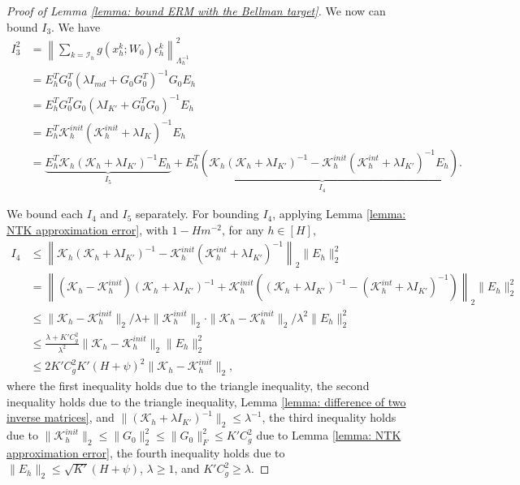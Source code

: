 \documentclass{article} \usepackage{iclr2023/iclr2023_conference,times}
\begin{document}
\begin{proof}[Proof of Lemma \ref{lemma: bound ERM with the Bellman target}]
We now can bound $I_3$. We have 
\begin{align}
    I_3^2 &= \left\| \sum_{k=\mathcal{I}_h} g(x^k_h; W_0) \epsilon^k_h \right\|_{\Lambda_h^{-1}}^2 \nonumber \\ 
    &= E_h^T G_0^T (\lambda I_{md} + G_0 G_0^T)^{-1} G_0 E_h \nonumber \\ 
    &= E_h^T G_0^T G_0 (\lambda I_{K'} + G_0^T G_0)^{-1} E_h \nonumber \\  
    &= E_h^T  \mathcal{K}^{init}_h ( \mathcal{K}^{init}_h + \lambda I_K)^{-1} E_h \nonumber \nonumber \\  
    &= \underbrace{E_h^T  \mathcal{K}_h ( \mathcal{K}_h + \lambda I_{K'})^{-1} E_h}_{I_5} +  \underbrace{ E_h^T \left( \mathcal{K}_h ( \mathcal{K}_h + \lambda I_{K'})^{-1} - \mathcal{K}^{init}_h ( \mathcal{K}^{int}_h + \lambda I_{K'})^{-1}  E_h \right)}_{I_4}.
    \label{eq: I3 in terms of I4 and I5}
\end{align}


We bound each $I_4$ and $I_5$ separately. For bounding $I_4$, applying Lemma \ref{lemma: NTK approximation error}, with $1 - H m^{-2}$, for any $h \in [H]$, 
\begin{align}
     I_4  &\leq \left\| \mathcal{K}_h ( \mathcal{K}_h + \lambda I_{K'})^{-1} - \mathcal{K}^{init}_h ( \mathcal{K}^{int}_h + \lambda I_{K'})^{-1} \right\|_2 \| E_h \|_2^2 \nonumber\\ 
    &= \left\| (\mathcal{K}_h - \mathcal{K}_h^{init}) ( \mathcal{K}_h + \lambda I_{K'})^{-1} + \mathcal{K}_h^{init} \left( ( \mathcal{K}_h + \lambda I_{K'})^{-1} -  (\mathcal{K}^{int}_h + \lambda I_{K'})^{-1}\right) \right\|_2 \| E_h \|_2^2 \nonumber\\
    &\leq  \| \mathcal{K}_h -  \mathcal{K}_h^{init} \|_2 / \lambda + \| \mathcal{K}_h^{init} \|_2 \cdot \| \mathcal{K}_h - \mathcal{K}_h^{init} \|_2 / \lambda^{2} \| E_h \|_2^2 \nonumber\\
    &\leq \frac{\lambda + K' C_g^2}{\lambda^2} \| \mathcal{K}_h - \mathcal{K}_h^{init} \|_2 \| E_h \|_2^2 \nonumber\\ 
&\leq 2 K' C_g^2  K' (H + \psi)^2  \| \mathcal{K}_h - \mathcal{K}_h^{init} \|_2,
    \label{eq: bound approx error of self-normalized process}
\end{align}
where the first inequality holds due to the triangle inequality, the second inequality holds due to the triangle inequality, Lemma \ref{lemma: difference of two inverse matrices}, and $\|( \mathcal{K}_h + \lambda I_{K'})^{-1} \|_2 \leq \lambda^{-1}$, the third inequality holds due to $\| \mathcal{K}_h^{init} \|_2 \leq \|G_0\|_2^2 \leq \| G_0 \|_F^2 \leq K' C_g^2$ due to Lemma \ref{lemma: NTK approximation error}, the fourth inequality holds due to $\|E_h \|_2 \leq \sqrt{K'} (H + \psi)$, $\lambda \geq 1$, and $K' C_g^2 \geq \lambda$. 


\end{proof}
\end{document}
